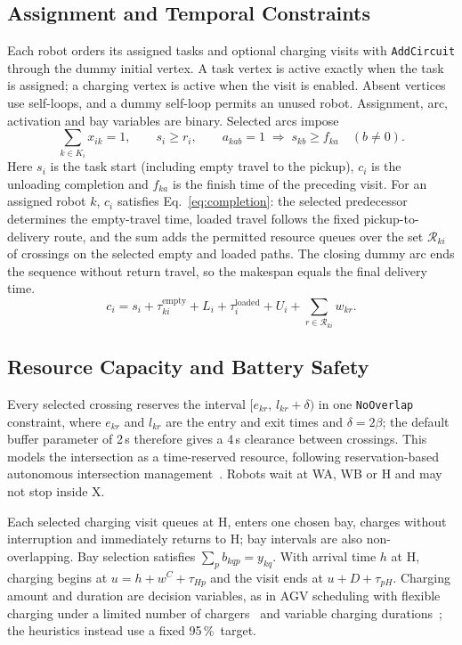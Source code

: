 \documentclass[11pt,a4paper]{article}
\newcommand{\code}[1]{\texttt{#1}}
\newcommand{\pct}{\,\%}
\begin{document}
\subsection{Assignment and Temporal Constraints}

Each robot orders its assigned tasks and optional charging visits with \code{AddCircuit} through the
dummy initial vertex. A task vertex is active exactly when the task is assigned; a charging vertex is
active when the visit is enabled. Absent vertices use self-loops, and a dummy self-loop permits an
unused robot. Assignment, arc, activation and bay variables are binary. Selected arcs impose
\begin{equation}
\sum_{k \in K_i} x_{ik} = 1, \qquad s_i \ge r_i, \qquad
a_{kab} = 1 \;\Rightarrow\; s_{kb} \ge f_{ka} \quad (b \ne 0).
\label{eq:assign}
\end{equation}
Here $s_i$ is the task start (including empty travel to the pickup), $c_i$ is the unloading completion
and $f_{ka}$ is the finish time of the preceding visit. For an assigned robot $k$, $c_i$ satisfies
Eq.~\eqref{eq:completion}: the selected predecessor determines the empty-travel time, loaded travel
follows the fixed pickup-to-delivery route, and the sum adds the permitted resource queues over the set
$\mathcal{R}_{ki}$ of crossings on the selected empty and loaded paths. The closing dummy arc ends the
sequence without return travel, so the makespan equals the final delivery time.
\begin{equation}
c_i = s_i + \tau^{\text{empty}}_{ki} + L_i + \tau^{\text{loaded}}_{i} + U_i
  + \sum_{r \in \mathcal{R}_{ki}} w_{kr}.
\label{eq:completion}
\end{equation}

\subsection{Resource Capacity and Battery Safety}

Every selected crossing reserves the interval $[e_{kr},\, l_{kr} + \delta)$ in one \code{NoOverlap}
constraint, where $e_{kr}$ and $l_{kr}$ are the entry and exit times and $\delta = 2\beta$; the default
buffer parameter of 2\,s therefore gives a 4\,s clearance between crossings. This models the
intersection as a time-reserved resource, following reservation-based autonomous intersection
management~\cite{dresner2008}. Robots wait at WA, WB or H and may not stop inside X.

Each selected charging visit queues at H, enters one chosen bay, charges without interruption and
immediately returns to H; bay intervals are also non-overlapping. Bay selection satisfies
$\sum_{p} b_{kqp} = y_{kq}$. With arrival time $h$ at H, charging begins at
$u = h + w^{C} + \tau_{Hp}$ and the visit ends at $u + D + \tau_{pH}$. Charging amount and duration are
decision variables, as in AGV scheduling with flexible charging under a limited number of
chargers~\cite{li2025chargers} and variable charging durations~\cite{li2025battery};
the heuristics instead use a fixed 95\pct\ target.
\end{document}
